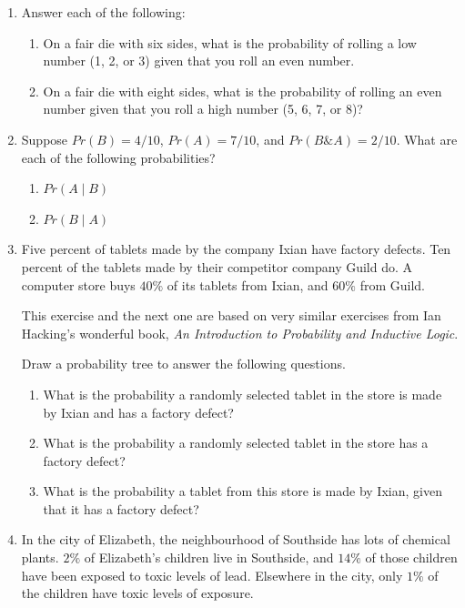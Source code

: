 \documentclass[justified]{tufte-book}
\providecommand{\tightlist}{%
  \setlength{\itemsep}{0pt}\setlength{\parskip}{0pt}}
\newcommand{\given}{\mid}
\renewcommand{\wedge}{\mathbin{\&}}
\newcommand{\p}{Pr}
\theoremstyle{definition}
\theoremstyle{definition}
\theoremstyle{definition}
\theoremstyle{remark}
\begin{document}
\begin{enumerate}
\item
  Answer each of the following:

  \begin{enumerate}
  \def\labelenumii{\alph{enumii}.}
  \tightlist
  \item
    On a fair die with six sides, what is the probability of rolling a low number (1, 2, or 3) given that you roll an even number.
  \item
    On a fair die with eight sides, what is the probability of rolling an even number given that you roll a high number (5, 6, 7, or 8)?
  \end{enumerate}
\item
  Suppose \(\p(B) = 4/10\), \(\p(A) = 7/10\), and \(\p(B \wedge A) = 2/10\).
  What are each of the following probabilities?

  \begin{enumerate}
  \def\labelenumii{\alph{enumii}.}
  \tightlist
  \item
    \(\p(A \given B)\)
  \item
    \(\p(B \given A)\)
  \end{enumerate}
\item
  Five percent of tablets made by the company Ixian have factory defects. Ten percent of the tablets made by their competitor company Guild do. A computer store buys \(40\%\) of its tablets from Ixian, and \(60\%\) from Guild.

  \begin{marginfigure}
   This exercise and the next one are based on very similar exercises from
   Ian Hacking's wonderful book, \emph{An Introduction to Probability and
   Inductive Logic}.
   \end{marginfigure}

  Draw a probability tree to answer the following questions.

  \begin{enumerate}
  \def\labelenumii{\alph{enumii}.}
  \tightlist
  \item
    What is the probability a randomly selected tablet in the store is made by Ixian and has a factory defect?
  \item
    What is the probability a randomly selected tablet in the store has a factory defect?
  \item
    What is the probability a tablet from this store is made by Ixian, given that it has a factory defect?
  \end{enumerate}
\item
  In the city of Elizabeth, the neighbourhood of Southside has lots of chemical plants. \(2\%\) of Elizabeth's children live in Southside, and \(14\%\) of those children have been exposed to toxic levels of lead. Elsewhere in the city, only \(1\%\) of the children have toxic levels of exposure.


\end{enumerate}
\end{document}
